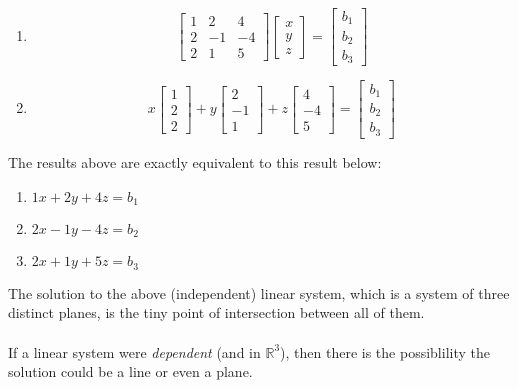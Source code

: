 \documentclass[12pt]{article}
\newcommand{\R}{\mathbb{R}}
\begin{document}
\begin{enumerate}
\item $$\begin{bmatrix}
    1 & 2 & 4 \\
    2 & -1 & -4 \\
    2 & 1 & 5 
\end{bmatrix} \begin{bmatrix}
    x \\ y \\ z
\end{bmatrix} = \begin{bmatrix}
    b_1 \\ b_2 \\ b_3
\end{bmatrix}$$

\item $$x \begin{bmatrix} 1\\ 2\\ 2 \end{bmatrix} + y \begin{bmatrix} 2 \\ -1 \\ 1 \end{bmatrix} + z \begin{bmatrix} 4 \\ -4 \\ 5 \end{bmatrix} = \begin{bmatrix} b_1 \\ b_2 \\ b_3 \end{bmatrix}$$
\end{enumerate}

    The results above are exactly equivalent to this result below:

\begin{enumerate}
    \item $1x + 2y + 4z = b_1$
    \item $2x - 1y - 4z = b_2$
    \item $2x + 1y + 5z = b_3$
\end{enumerate}

The solution to the above (independent) linear system, which is a system of three distinct planes, is the tiny point of intersection between all of them. \\ \\

If a linear system were \emph{dependent} (and in $\R^3$), then there is the possiblility the solution could be a line or even a plane.
\end{document}
